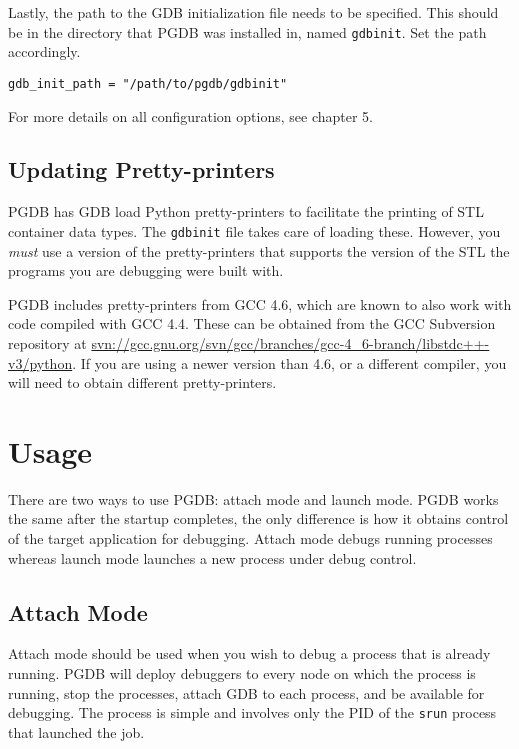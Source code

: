 \documentclass{refart}
\newcommand{\lmargintt}[1]{\marginlabel{\texttt{#1}} \index{#1}}
\begin{document}
\lmargintt{gdb\_init\_path}
Lastly, the path to the GDB initialization file needs to be specified. This should be in the directory that PGDB was installed in, named \texttt{gdbinit}. Set the path accordingly.

\begin{Verbatim}
gdb_init_path = "/path/to/pgdb/gdbinit"
\end{Verbatim}

For more details on all configuration options, see chapter 5.

\subsection{Updating Pretty-printers}

PGDB has GDB load Python pretty-printers to facilitate the printing of STL container data types. The \texttt{gdbinit} file takes care of loading these. However, you \emph{must} use a version of the pretty-printers that supports the version of the STL the programs you are debugging were built with.

PGDB includes pretty-printers from GCC 4.6, which are known to also work with code compiled with GCC 4.4. These can be obtained from the GCC Subversion repository at \url{svn://gcc.gnu.org/svn/gcc/branches/gcc-4_6-branch/libstdc++-v3/python}. If you are using a newer version than 4.6, or a different compiler, you will need to obtain different pretty-printers.

\newpage

\section{Usage}

There are two ways to use PGDB: attach mode and launch mode. PGDB works the same after the startup completes, the only difference is how it obtains control of the target application for debugging. Attach mode debugs running processes whereas launch mode launches a new process under debug control.

\subsection{Attach Mode}

Attach mode should be used when you wish to debug a process that is already running. PGDB will deploy debuggers to every node on which the process is running, stop the processes, attach GDB to each process, and be available for debugging. The process is simple and involves only the PID of the \texttt{srun} process that launched the job.
\end{document}
